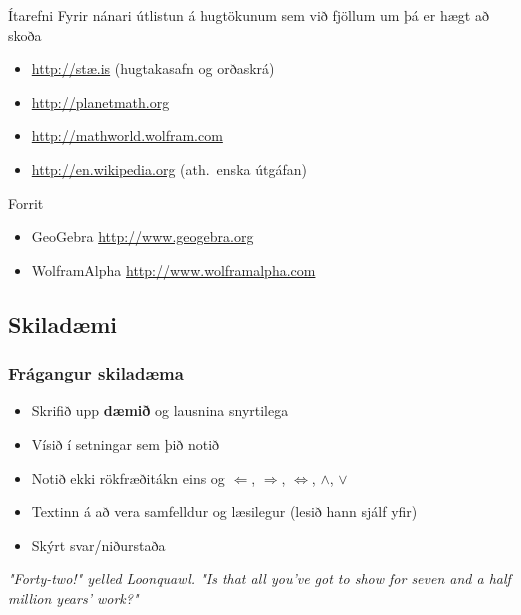 \documentclass[icelandic,a4paper,12pt]{article}
\begin{document}
\begin{frame}{Ítarefni}
 Fyrir nánari útlistun á hugtökunum sem við fjöllum um þá er hægt að skoða
\begin{itemize}
 \item \href{http://stae.is}{http://stæ.is} (hugtakasafn og orðaskrá)
  \item \href{http://planetmath.org}{http://planetmath.org}
  \item \href{http://mathworld.wolfram.com}{http://mathworld.wolfram.com}
  \item \href{http://en.wikipedia.org}{http://en.wikipedia.org} (ath.~enska útgáfan)
\end{itemize}

\pause
\begin{block}{Forrit}
 \begin{itemize}
  \item GeoGebra \href{http://www.geogebra.org}{http://www.geogebra.org}
  \item WolframAlpha \href{http://www.wolframalpha.com}{http://www.wolframalpha.com}
 \end{itemize}

\end{block}

\end{frame}


 \subsection{Skiladæmi}
 \subsubsection{Frágangur skiladæma}
 \begin{itemize}
 \item Skrifið upp {\bf dæmið} og lausnina snyrtilega
 \pause
 \item Vísið í setningar sem þið notið
 \pause
 \item Notið ekki rökfræðitákn eins og $\Leftarrow$, 
 $\Rightarrow$, $\Leftrightarrow$, $\wedge$, $\vee$
 \pause
 \item Textinn á að vera samfelldur og læsilegur (lesið hann 
 sjálf yfir)
 \pause
 \item Skýrt svar/niðurstaða
 \end{itemize}
 
 
\pause
\emph{"Forty-two!" yelled Loonquawl. "Is that all you've got to show 
for seven and a half million years' work?"}
\end{document}
